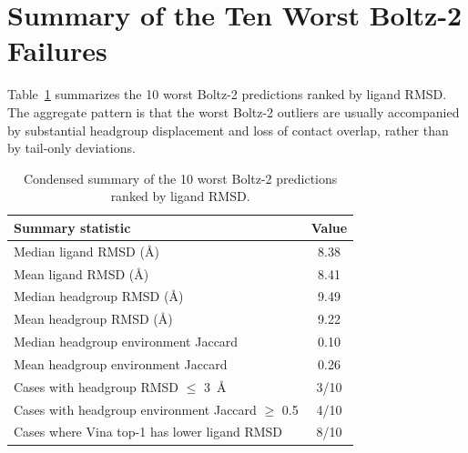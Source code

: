 \documentclass[journal=jcisd8,manuscript=suppinfo]{achemso}
\begin{document}
\section{Summary of the Ten Worst Boltz-2 Failures}

Table~\ref{tab:worst_cases} summarizes the 10 worst Boltz-2 predictions ranked by ligand RMSD. The aggregate pattern is that the worst Boltz-2 outliers are usually accompanied by substantial headgroup displacement and loss of contact overlap, rather than by tail-only deviations.

\begin{table}[htbp]
\centering
\small
\caption{Condensed summary of the 10 worst Boltz-2 predictions ranked by ligand RMSD.}
\label{tab:worst_cases}
\begin{tabular}{@{}lc@{}}
\toprule
Summary statistic & Value \\
\midrule
Median ligand RMSD (\AA) & 8.38 \\
Mean ligand RMSD (\AA) & 8.41 \\
Median headgroup RMSD (\AA) & 9.49 \\
Mean headgroup RMSD (\AA) & 9.22 \\
Median headgroup environment Jaccard & 0.10 \\
Mean headgroup environment Jaccard & 0.26 \\
Cases with headgroup RMSD $\leq$ \SI{3}{\angstrom} & 3/10 \\
Cases with headgroup environment Jaccard $\geq$ 0.5 & 4/10 \\
Cases where Vina top-1 has lower ligand RMSD & 8/10 \\
\bottomrule
\end{tabular}
\end{table}
\end{document}
